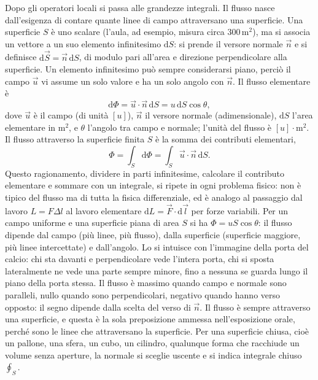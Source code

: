 \documentclass[11pt,a4paper]{article}
\newcommand{\dd}{\mathrm{d}}
\newcommand{\un}[1]{\,\mathrm{#1}}
\begin{document}
Dopo gli operatori locali si passa alle grandezze integrali. Il flusso nasce dall'esigenza di contare quante linee di campo attraversano una superficie. Una superficie $S$ è uno scalare (l'aula, ad esempio, misura circa $300\un{m^2}$), ma si associa un vettore a un suo elemento infinitesimo $\dd S$: si prende il versore normale $\vec n$ e si definisce $\dd\vec S=\vec n\,\dd S$, di modulo pari all'area e direzione perpendicolare alla superficie. Un elemento infinitesimo può sempre considerarsi piano, perciò il campo $\vec u$ vi assume un solo valore e ha un solo angolo con $\vec n$. Il flusso elementare è
\[
\dd\Phi=\vec u\cdot\vec n\,\dd S=u\,\dd S\cos\theta ,
\]
dove $\vec u$ è il campo (di unità $[u]$), $\vec n$ il versore normale (adimensionale), $\dd S$ l'area elementare in $\mathrm{m^2}$, e $\theta$ l'angolo tra campo e normale; l'unità del flusso è $[u]\cdot\mathrm{m^2}$. Il flusso attraverso la superficie finita $S$ è la somma dei contributi elementari,
\[
\Phi=\int_S\dd\Phi=\int_S\vec u\cdot\vec n\,\dd S .
\]
Questo ragionamento, dividere in parti infinitesime, calcolare il contributo elementare e sommare con un integrale, si ripete in ogni problema fisico: non è tipico del flusso ma di tutta la fisica differenziale, ed è analogo al passaggio dal lavoro $L=F\Delta{l}$ al lavoro elementare $\dd L=\vec F\cdot\dd\vec l$ per forze variabili. Per un campo uniforme e una superficie piana di area $S$ si ha $\Phi=uS\cos\theta$: il flusso dipende dal campo (più linee, più flusso), dalla superficie (superficie maggiore, più linee intercettate) e dall'angolo. Lo si intuisce con l'immagine della porta del calcio: chi sta davanti e perpendicolare vede l'intera porta, chi si sposta lateralmente ne vede una parte sempre minore, fino a nessuna se guarda lungo il piano della porta stessa. Il flusso è massimo quando campo e normale sono paralleli, nullo quando sono perpendicolari, negativo quando hanno verso opposto: il segno dipende dalla scelta del verso di $\vec n$. Il flusso è sempre attraverso una superficie, e questa è la sola preposizione ammessa nell'esposizione orale, perché sono le linee che attraversano la superficie. Per una superficie chiusa, cioè un pallone, una sfera, un cubo, un cilindro, qualunque forma che racchiude un volume senza aperture, la normale si sceglie uscente e si indica integrale chiuso  $\oint_S$.
\end{document}
